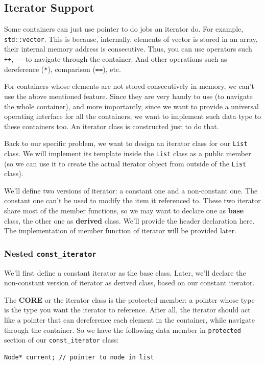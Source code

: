 \documentclass[11pt]{book}
\begin{document}
\subsection{Iterator Support}
\label{sec:org95331e4}
Some containers can just use pointer to do jobs an iterator do. For example, \texttt{std::vector}. This is because, internally, elements of vector is stored in an array, their internal memory address is consecutive. Thus, you can use operators such \texttt{++}, \texttt{-{}-} to navigate through the container. And other operations such as dereference (\texttt{*}), comparison (\texttt{==}), etc.

For containers whose elements are not stored consecutively in memory, we can't use the above mentioned feature. Since they are very handy to use (to navigate the whole container), and more importantly, since we want to provide a universal operating interface for all the containers, we want to implement such data type to these containers too. An iterator class is constructed just to do that.

Back to our specific problem, we want to design an iterator class for our \texttt{List} class. We will implement its template inside the \texttt{List} class as a public member (so we can use it to create the actual iterator object from outside of the \texttt{List} class).

We'll define two versions of iterator: a constant one and a non-constant one. The constant one can't be used to modify the item it referenced to. These two iterator share most of the member functions, so we may want to declare one as \textbf{base} class, the other one as \textbf{derived} class. We'll provide the header declaration here. The implementation of member function of iterator will be provided later.
\subsubsection{Nested \texttt{const\_iterator}}
\label{sec:org1510f33}
We'll first define a constant iterator as the base class. Later, we'll declare the non-constant version of iterator as derived class, based on our constant iterator.

The \textbf{CORE} or the iterator class is the protected member: a pointer whose type is the type you want the iterator to reference. After all, the iterator should act like a pointer that can dereference each element in the container, while navigate through the container. So we have the following data member in \texttt{protected} section of our \texttt{const\_iterator} class:
\begin{verbatim}
Node* current; // pointer to node in list 
\end{verbatim}
\end{document}
